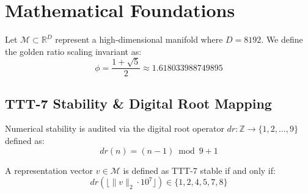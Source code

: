 \section{Mathematical Foundations}
Let $\mathcal{M} \subset \mathbb{R}^D$ represent a high-dimensional manifold where $D = 8192$. We define the golden ratio scaling invariant as:
\begin{equation}
    \phi = \frac{1 + \sqrt{5}}{2} \approx 1.618033988749895
\end{equation}

\subsection{TTT-7 Stability & Digital Root Mapping}
Numerical stability is audited via the digital root operator $dr: \mathbb{Z} \to \{1, 2, \dots, 9\}$ defined as:
\begin{equation}
    dr(n) = (n - 1) \bmod 9 + 1
\end{equation}

A representation vector $v \in \mathcal{M}$ is defined as TTT-7 stable if and only if:
\begin{equation}
    dr(\lfloor \|v\|_2 \cdot 10^7 \rfloor) \in \{1, 2, 4, 5, 7, 8\}
\end{equation}